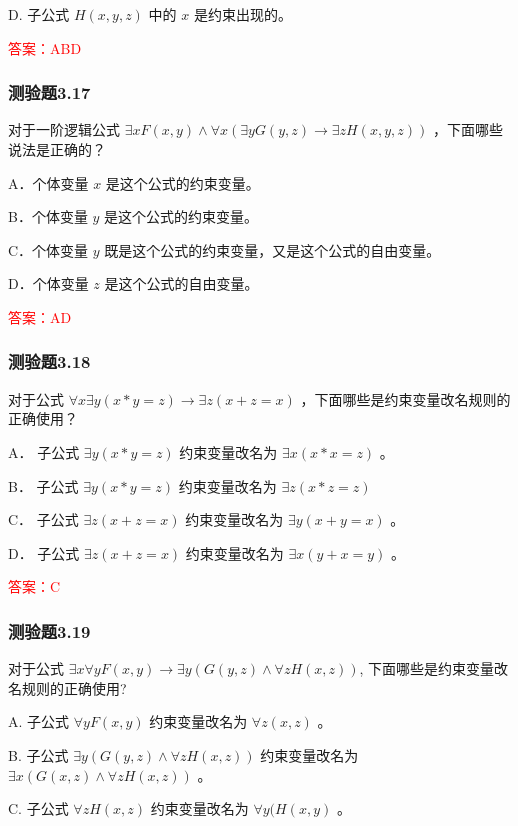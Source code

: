 \documentclass[UTF8, heading=true]{ctexart}
\begin{document}
D. 
子公式 $H(x, y, z)$ 中的 $x$ 是约束出现的。

\textcolor{red}{答案：ABD}

\subsubsection{测验题3.17}

对于一阶逻辑公式 $\exists x F(x, y) \wedge \forall x(\exists y G(y, z) \rightarrow \exists z H(x, y, z))$ ，下面哪些说法是正确的？

A．个体变量 $x$ 是这个公式的约束变量。

B．个体变量 $y$ 是这个公式的约束变量。

C．个体变量 $y$ 既是这个公式的约束变量，又是这个公式的自由变量。

D．个体变量 $z$ 是这个公式的自由变量。

\textcolor{red}{答案：AD}

\subsubsection{测验题3.18}

对于公式 $\forall x \exists y(x * y=z) \rightarrow \exists z(x+z=x)$ ，下面哪些是约束变量改名规则的正确使用？

A．
子公式 $\exists y(x * y=z)$ 约束变量改名为 $\exists x(x * x=z)$ 。

B．
子公式 $\exists y(x * y=z)$ 约束变量改名为 $\exists z(x * z=z)$

C．
子公式 $\exists z(x+z=x)$ 约束变量改名为 $\exists y(x+y=x)$ 。

D．
子公式 $\exists z(x+z=x)$ 约束变量改名为 $\exists x(y+x=y)$ 。

\textcolor{red}{答案：C}

\subsubsection{测验题3.19}

对于公式 $\exists x \forall y F(x, y) \rightarrow \exists y(G(y, z) \wedge \forall z H(x, z))$, 下面哪些是约束变量改名规则的正确使用?

A. 子公式 $\forall y F(x, y)$ 约束变量改名为 $\forall z(x, z)$ 。

B. 子公式 $\exists y(G(y, z) \wedge \forall z H(x, z))$ 约束变量改名为 $\exists x(G(x, z) \wedge \forall z H(x, z))$ 。

C. 子公式 $\forall z H(x, z)$ 约束变量改名为 $\forall y(H(x, y)$ 。
\end{document}
